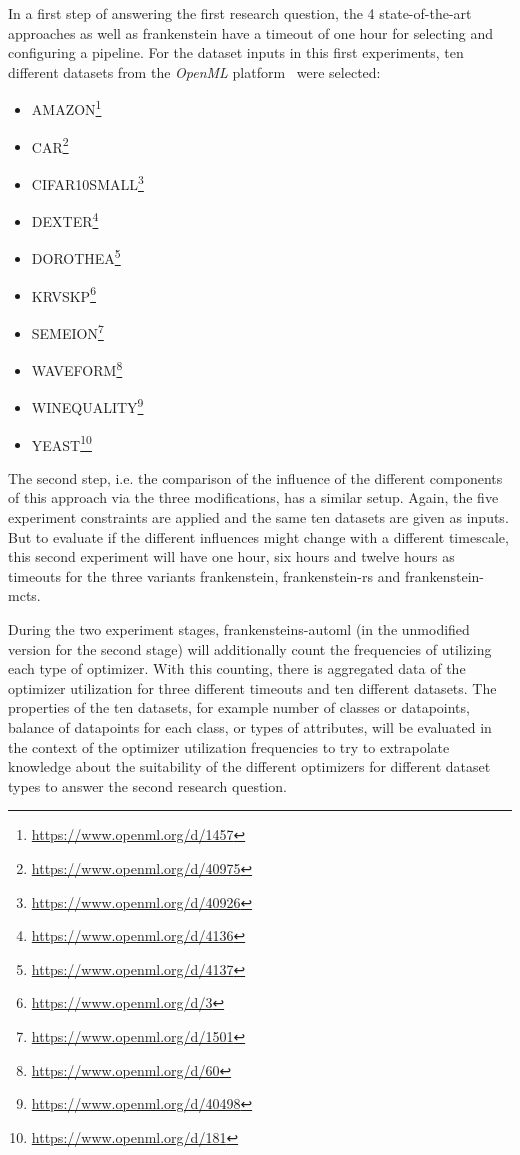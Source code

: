 In a first step of answering the first research question, the 4 state-of-the-art approaches as well as frankenstein have a timeout of one hour for selecting and configuring a pipeline.
For the dataset inputs in this first experiments, ten different datasets from the \textit{OpenML} platform~\cite{Vanschoren-OpenML} were selected:
\begin{itemize}
    \item AMAZON\footnote{\url{https://www.openml.org/d/1457}}
    \item CAR\footnote{\url{https://www.openml.org/d/40975}}
    \item CIFAR10SMALL\footnote{\url{https://www.openml.org/d/40926}}
    \item DEXTER\footnote{\url{https://www.openml.org/d/4136}}
    \item DOROTHEA\footnote{\url{https://www.openml.org/d/4137}}
    \item KRVSKP\footnote{\url{https://www.openml.org/d/3}}
    \item SEMEION\footnote{\url{https://www.openml.org/d/1501}}
    \item WAVEFORM\footnote{\url{https://www.openml.org/d/60}}
    \item WINEQUALITY\footnote{\url{https://www.openml.org/d/40498}}
    \item YEAST\footnote{\url{https://www.openml.org/d/181}}
\end{itemize}

The second step, i.e. the comparison of the influence of the different components of this approach via the three modifications, has a similar setup.
Again, the five experiment constraints are applied and the same ten datasets are given as inputs.
But to evaluate if the different influences might change with a different timescale, this second experiment will have one hour, six hours and twelve hours as timeouts for the three variants frankenstein, frankenstein-rs and frankenstein-mcts.

During the two experiment stages, frankensteins-automl (in the unmodified version for the second stage) will additionally count the frequencies of utilizing each type of optimizer.
With this counting, there is aggregated data of the optimizer utilization for three different timeouts and ten different datasets.
The properties of the ten datasets, for example number of classes or datapoints, balance of datapoints for each class, or types of attributes, will be evaluated in the context of the optimizer utilization frequencies to try to extrapolate knowledge about the suitability of the different optimizers for different dataset types to answer the second research question.

